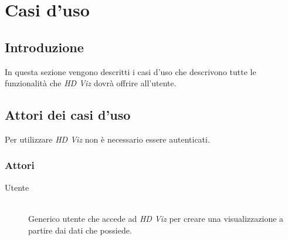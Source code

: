\section{Casi d'uso}
    \subsection{Introduzione}
    In questa sezione vengono descritti i casi d'uso che descrivono tutte le funzionalità che \emph{HD Viz} dovrà offrire all'utente.
    \subsection{Attori dei casi d'uso}
    Per utilizzare \emph{HD Viz} non è necessario essere autenticati.
    \subsubsection{Attori}
    \begin{description}
        \item[Utente] \hfill \\Generico utente che accede ad \emph{HD Viz} per creare una visualizzazione a partire dai dati che possiede.
    \end{description}
    
    \pagebreak
    
    \pagebreak
    
    \pagebreak
    
    \pagebreak
    
    \pagebreak
    
    \pagebreak
    
    \pagebreak
    
    \pagebreak
    
    \pagebreak
    